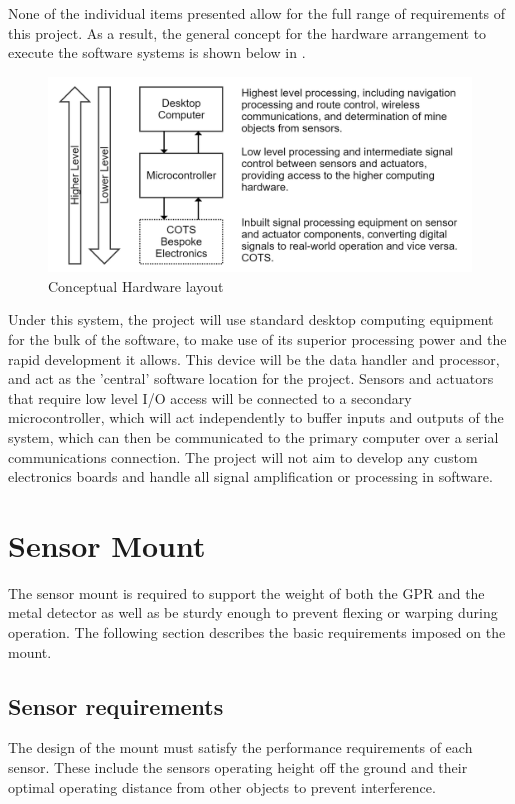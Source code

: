 \documentclass[main.tex]{subfiles}
\begin{document}
None of the individual items presented allow for the full range of requirements of this project. As a result, the general concept for the hardware arrangement to execute the software systems is shown below in .
\begin{figure}[ht]
\includegraphics[width = \textwidth]{4-ConceptDesign/electronics.png}
\centering
\caption{Conceptual Hardware layout} 
\end{figure}

Under this system, the project will use standard desktop computing equipment for the bulk of the software, to make use of its superior processing power and the rapid development it allows. This device will be the data handler and processor, and act as the 'central' software location for the project. Sensors and actuators that require low level I/O access will be connected to a secondary microcontroller, which will act independently to buffer inputs and outputs of the system, which can then be communicated to the primary computer over a serial communications connection. The project will not aim to develop any custom electronics boards and handle all signal amplification or processing in software.

\section{Sensor Mount}
The sensor mount is required to support the weight of both the GPR and the metal detector as well as be sturdy enough to prevent flexing or warping during operation. The following section describes the basic requirements imposed on the mount.  
\subsection {Sensor requirements } 
The design of the mount must satisfy the performance requirements of each sensor. These include the sensors operating height off the ground and their optimal operating distance from other objects to prevent interference. 
\end{document}
